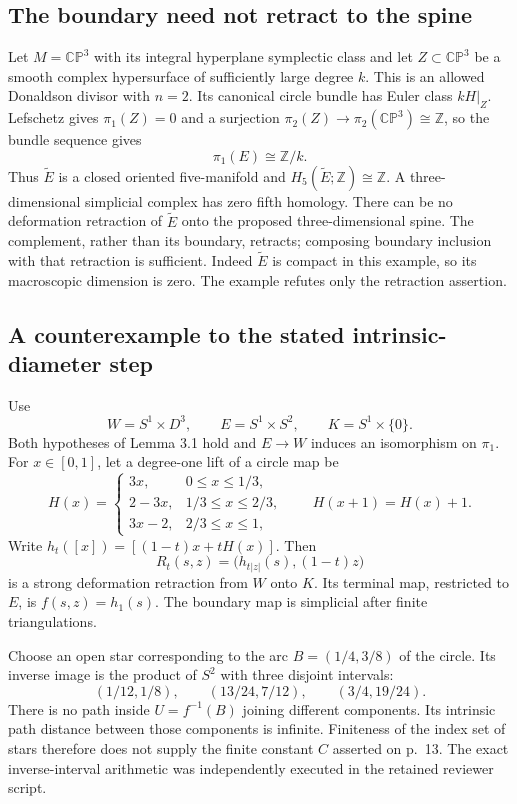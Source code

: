 \documentclass[10pt]{article}
\begin{document}
\subsection*{The boundary need not retract to the spine}
Let \(M=\mathbb{CP}^3\) with its integral hyperplane symplectic class and let \(Z\subset\mathbb{CP}^3\) be a smooth complex hypersurface of sufficiently large degree \(k\). This is an allowed Donaldson divisor with \(n=2\). Its canonical circle bundle has Euler class \(kH|_Z\). Lefschetz gives \(\pi_1(Z)=0\) and a surjection \(\pi_2(Z)\to\pi_2(\mathbb{CP}^3)\cong\mathbb Z\), so the bundle sequence gives \[\pi_1(E)\cong\mathbb Z/k.\] Thus \(\widetilde E\) is a closed oriented five-manifold and \(H_5(\widetilde E;\mathbb Z)\cong\mathbb Z\). A three-dimensional simplicial complex has zero fifth homology. There can be no deformation retraction of \(\widetilde E\) onto the proposed three-dimensional spine. The complement, rather than its boundary, retracts; composing boundary inclusion with that retraction is sufficient. Indeed \(\widetilde E\) is compact in this example, so its macroscopic dimension is zero. The example refutes only the retraction assertion.\par
\subsection*{A counterexample to the stated intrinsic-diameter step}
Use \[W=S^1\times D^3,\qquad E=S^1\times S^2,\qquad K=S^1\times\{0\}.\] Both hypotheses of Lemma 3.1 hold and \(E\to W\) induces an isomorphism on \(\pi_1\). For \(x\in[0,1]\), let a degree-one lift of a circle map be \[H(x)=
 \begin{cases}
  3x,&0\le x\le1/3,\\
  2-3x,&1/3\le x\le2/3,\\
  3x-2,&2/3\le x\le1,
 \end{cases}
 \qquad H(x+1)=H(x)+1.\] Write \(h_t([x])=[(1-t)x+tH(x)]\). Then \[R_t(s,z)=\bigl(h_{t|z|}(s),(1-t)z\bigr)\] is a strong deformation retraction from \(W\) onto \(K\). Its terminal map, restricted to \(E\), is \(f(s,z)=h_1(s)\). The boundary map is simplicial after finite triangulations.\par
Choose an open star corresponding to the arc \(B=(1/4,3/8)\) of the circle. Its inverse image is the product of \(S^2\) with three disjoint intervals: \[(1/12,1/8),\qquad(13/24,7/12),\qquad(3/4,19/24).\] There is no path inside \(U=f^{-1}(B)\) joining different components. Its intrinsic path distance between those components is infinite. Finiteness of the index set of stars therefore does not supply the finite constant \(C\) asserted on p. 13. The exact inverse-interval arithmetic was independently executed in the retained reviewer script.\par
\end{document}
